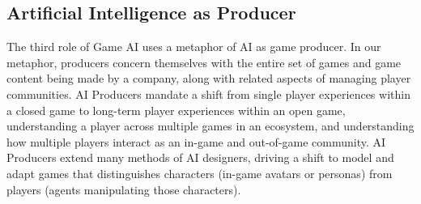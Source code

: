 \documentclass[conference]{IEEEtran}
\begin{document}






\subsection{Artificial Intelligence as Producer}

The third role of Game AI uses a metaphor of AI as game producer. 
In our metaphor, producers concern themselves with the entire set of games and game content being made by a company, along with related aspects of managing player communities. 
AI Producers mandate a shift from single player experiences within a closed game to long-term player experiences within an open game, understanding a player across multiple games in an ecosystem, and understanding how multiple players interact as an in-game and out-of-game community. 
AI Producers extend many methods of AI designers, driving a shift to model and adapt games that distinguishes characters (in-game avatars or personas) from players (agents manipulating those characters). 
\end{document}
